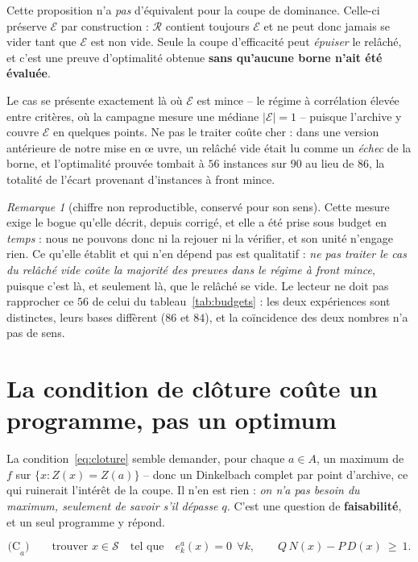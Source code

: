\documentclass[11pt,a4paper]{article}
\theoremstyle{plain}
\theoremstyle{remark}
\newtheorem{remark}{Remarque}
\newcommand{\Ecal}{\mathcal{E}}
\newcommand{\Scal}{\mathcal{S}}
\newcommand{\Rcal}{\mathcal{R}}
\begin{document}
\noindent
Cette proposition n'a \emph{pas} d'équivalent pour la coupe de dominance.
Celle-ci préserve $\Ecal$ par construction : $\Rcal$ contient toujours
$\Ecal$ et ne peut donc jamais se vider tant que $\Ecal$ est non vide. Seule
la coupe d'efficacité peut \emph{épuiser} le relâché, et c'est une preuve
d'optimalité obtenue \textbf{sans qu'aucune borne n'ait été évaluée}.

Le cas se présente exactement là où $\Ecal$ est mince -- le régime à
corrélation élevée entre critères, où la campagne mesure une médiane
$|\Ecal|=1$ -- puisque l'archive y couvre $\Ecal$ en quelques points. Ne pas
le traiter coûte cher : dans une version antérieure de notre mise en \oe
uvre, un relâché vide était lu comme un \emph{échec} de la borne, et
l'optimalité prouvée tombait à $56$ instances sur $90$ au lieu de $86$, la
totalité de l'écart provenant d'instances à front mince.

\begin{remark}[chiffre non reproductible, conservé pour son sens]
Cette mesure exige le bogue qu'elle décrit, depuis corrigé, et elle a été
prise sous budget en \emph{temps} : nous ne pouvons donc ni la rejouer ni la
vérifier, et son unité n'engage rien. Ce qu'elle établit et qui n'en dépend
pas est qualitatif : \emph{ne pas traiter le cas du relâché vide coûte la
majorité des preuves dans le régime à front mince}, puisque c'est là, et
seulement là, que le relâché se vide. Le lecteur ne doit pas rapprocher ce
$56$ de celui du tableau~\ref{tab:budgets} : les deux expériences sont
distinctes, leurs bases diffèrent ($86$ et $84$), et la coïncidence des deux
nombres n'a pas de sens.
\end{remark}

\section{La condition de clôture coûte un programme, pas un optimum}
\label{sec:cloture}

La condition~\eqref{eq:cloture} semble demander, pour chaque $a\in A$, un
maximum de $f$ sur $\{x:Z(x)=Z(a)\}$ -- donc un Dinkelbach complet par point
d'archive, ce qui ruinerait l'intérêt de la coupe. Il n'en est rien :
\emph{on n'a pas besoin du maximum, seulement de savoir s'il dépasse $q$}.
C'est une question de \textbf{faisabilité}, et un seul programme y répond.

\begin{equation}\label{eq:clot}
  \text{(C}_a\text{)}\qquad
  \text{trouver } x\in\Scal
  \quad\text{tel que}\quad
  e^a_k(x)=0\ \ \forall k,
  \qquad Q\,N(x)-P\,D(x)\ \ge\ 1 .
\end{equation}
\end{document}
